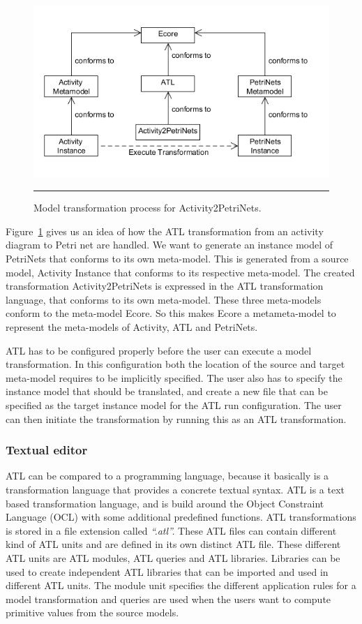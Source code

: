 \begin{figure}[H]
	\centering
	\includegraphics[scale=0.55]{figures/ATL.png}
	\rule{35em}{0.5pt}
	\caption[Model transformation for Atlas transformation language]
	{Model transformation process for Activity2PetriNets.}
	\label{fig:ATL}
\end{figure}

Figure~\ref{fig:ATL} gives us an idea of how the ATL transformation from an activity
diagram to Petri net are handled. We want to generate an instance model of
PetriNets that conforms to its own meta-model. This is generated from a source
model, Activity Instance that conforms to its respective meta-model.
The created transformation Activity2PetriNets is expressed in the ATL
transformation  language, that conforms to its own meta-model. These three
meta-models conform to the meta-model Ecore. So this makes Ecore a metameta-model
to represent the meta-models of Activity, ATL and PetriNets.

ATL has to be configured properly before the user can execute a model
transformation. In this configuration both the location of the source and target
meta-model requires to be implicitly specified. The user also has to specify
the instance model that should be translated, and create a new file that can be
specified as the target instance model for the ATL run configuration. The user
can then initiate the transformation by running this as an ATL transformation.


\subsubsection*{Textual editor}

ATL can be compared to a programming language, because it
basically is a transformation language that provides a concrete textual syntax.
ATL is a text based transformation language, and is build around the Object
Constraint Language (OCL) \cite{OCL} with some additional predefined functions.
ATL transformations is stored in a file extension called \textit{``.atl''.}
These ATL files can contain different kind of ATL units and are defined in its own
distinct ATL file. These different ATL units are ATL modules, ATL queries and
ATL libraries. Libraries can be used to create independent ATL libraries that
can be imported and used in different ATL units. The module unit
specifies the different application rules for a  model transformation and
queries are used when the users want to compute primitive values from the
source models.

